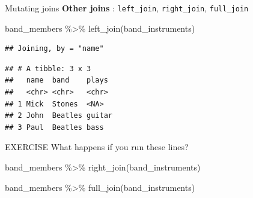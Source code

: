 \documentclass[
  ignorenonframetext,
]{beamer}
\newenvironment{Shaded}{\begin{snugshade}}{\end{snugshade}}
\newcommand{\FunctionTok}[1]{\textcolor[rgb]{0.00,0.00,0.00}{#1}}
\newcommand{\NormalTok}[1]{#1}
\newcommand{\SpecialCharTok}[1]{\textcolor[rgb]{0.00,0.00,0.00}{#1}}
\begin{document}
\begin{frame}[fragile]{Mutating joins}
\protect\hypertarget{mutating-joins-1}{}
\textbf{Other joins }: \texttt{left\_join}, \texttt{right\_join},
\texttt{full\_join}

\footnotesize

\begin{Shaded}
\begin{Highlighting}[]
\NormalTok{band\_members }\SpecialCharTok{\%\textgreater{}\%} 
    \FunctionTok{left\_join}\NormalTok{(band\_instruments)}
\end{Highlighting}
\end{Shaded}

\begin{verbatim}
## Joining, by = "name"
\end{verbatim}

\begin{verbatim}
## # A tibble: 3 x 3
##   name  band    plays 
##   <chr> <chr>   <chr> 
## 1 Mick  Stones  <NA>  
## 2 John  Beatles guitar
## 3 Paul  Beatles bass
\end{verbatim}

\normalsize
\end{frame}

\begin{frame}[fragile]{EXERCISE}
\protect\hypertarget{exercise-2}{}
What happens if you run these lines?

\footnotesize

\begin{Shaded}
\begin{Highlighting}[]
\NormalTok{band\_members }\SpecialCharTok{\%\textgreater{}\%} 
    \FunctionTok{right\_join}\NormalTok{(band\_instruments)}
\end{Highlighting}
\end{Shaded}

\normalsize

\footnotesize

\begin{Shaded}
\begin{Highlighting}[]
\NormalTok{band\_members }\SpecialCharTok{\%\textgreater{}\%} 
    \FunctionTok{full\_join}\NormalTok{(band\_instruments)}
\end{Highlighting}
\end{Shaded}

\normalsize
\end{frame}
\end{document}
